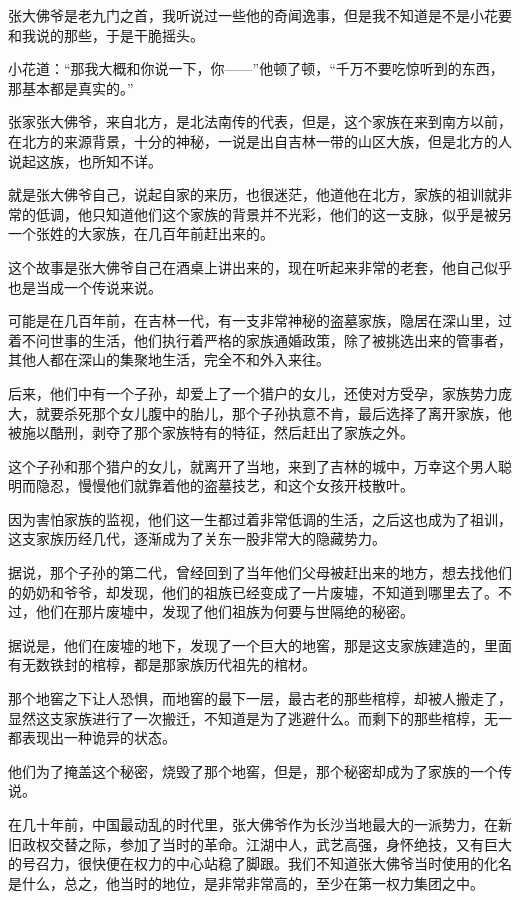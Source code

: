 张大佛爷是老九门之首，我听说过一些他的奇闻逸事，但是我不知道是不是小花要和我说的那些，于是干脆摇头。

小花道：“那我大概和你说一下，你——”他顿了顿，“千万不要吃惊听到的东西，那基本都是真实的。”

张家张大佛爷，来自北方，是北法南传的代表，但是，这个家族在来到南方以前，在北方的来源背景，十分的神秘，一说是出自吉林一带的山区大族，但是北方的人说起这族，也所知不详。

就是张大佛爷自己，说起自家的来历，也很迷茫，他道他在北方，家族的祖训就非常的低调，他只知道他们这个家族的背景并不光彩，他们的这一支脉，似乎是被另一个张姓的大家族，在几百年前赶出来的。

这个故事是张大佛爷自己在酒桌上讲出来的，现在听起来非常的老套，他自己似乎也是当成一个传说来说。

可能是在几百年前，在吉林一代，有一支非常神秘的盗墓家族，隐居在深山里，过着不问世事的生活，他们执行着严格的家族通婚政策，除了被挑选出来的管事者，其他人都在深山的集聚地生活，完全不和外入来往。

后来，他们中有一个子孙，却爱上了一个猎户的女儿，还使对方受孕，家族势力庞大，就要杀死那个女儿腹中的胎儿，那个子孙执意不肯，最后选择了离开家族，他被施以酷刑，剥夺了那个家族特有的特征，然后赶出了家族之外。

这个子孙和那个猎户的女儿，就离开了当地，来到了吉林的城中，万幸这个男人聪明而隐忍，慢慢他们就靠着他的盗墓技艺，和这个女孩开枝散叶。

因为害怕家族的监视，他们这一生都过着非常低调的生活，之后这也成为了祖训，这支家族历经几代，逐渐成为了关东一股非常大的隐藏势力。

据说，那个子孙的第二代，曾经回到了当年他们父母被赶出来的地方，想去找他们的奶奶和爷爷，却发现，他们的祖族已经变成了一片废墟，不知道到哪里去了。不过，他们在那片废墟中，发现了他们祖族为何要与世隔绝的秘密。

据说是，他们在废墟的地下，发现了一个巨大的地窖，那是这支家族建造的，里面有无数铁封的棺椁，都是那家族历代祖先的棺材。

那个地窖之下让人恐惧，而地窖的最下一层，最古老的那些棺椁，却被人搬走了，显然这支家族进行了一次搬迁，不知道是为了逃避什么。而剩下的那些棺椁，无一都表现出一种诡异的状态。

他们为了掩盖这个秘密，烧毁了那个地窖，但是，那个秘密却成为了家族的一个传说。

在几十年前，中国最动乱的时代里，张大佛爷作为长沙当地最大的一派势力，在新旧政权交替之际，参加了当时的革命。江湖中人，武艺高强，身怀绝技，又有巨大的号召力，很快便在权力的中心站稳了脚跟。我们不知道张大佛爷当时使用的化名是什么，总之，他当时的地位，是非常非常高的，至少在第一权力集团之中。

